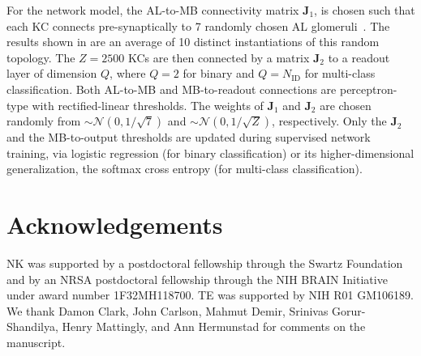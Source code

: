\documentclass[9pt,lineno]{elife}
\begin{document}
For the network model, the AL-to-MB connectivity matrix $\mathbf {J}_1$, is chosen such that  each KC connects pre-synaptically to 7 randomly chosen AL glomeruli~\citep{litwinkumar,abbott_axel}. The results shown in  are an average of 10 distinct instantiations of this random topology. The $Z=2500$ KCs are then connected by a matrix $\mathbf J_2$ to a readout layer of dimension $Q$, where $Q=2$ for binary and $Q=N_{\text{ID}}$ for multi-class classification. Both AL-to-MB and MB-to-readout connections are perceptron-type with rectified-linear thresholds. The weights of $\mathbf J_1$ and $\mathbf J_2$ are chosen randomly from $\sim \mathcal{N}(0, 1/\sqrt{7})$ and $\sim \mathcal{N}(0, 1/\sqrt{Z})$, respectively. Only the $\mathbf J_2$ and the MB-to-output thresholds are updated during supervised network training, via logistic regression (for binary classification) or its higher-dimensional generalization, the softmax cross entropy (for multi-class classification).


\section{Acknowledgements}

NK was supported by a postdoctoral fellowship through the Swartz Foundation and by an NRSA postdoctoral fellowship through the NIH BRAIN Initiative under award number 1F32MH118700. TE was supported by NIH R01 GM106189. We thank Damon  Clark, John Carlson, Mahmut Demir, Srinivas Gorur-Shandilya, Henry Mattingly, and Ann Hermunstad for comments on the manuscript. 







\end{document}
